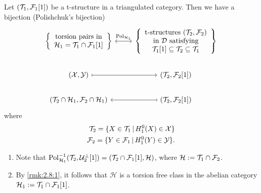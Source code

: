 \begin{prop}[Polishchuk]\label{prop:2.7}
  Let $(\mathcal{T}_1,\mathcal{F}_1[1])$ be a t-structure in a triangulated category.
  Then we have a bijection (Polishchuk's bijection)
  \begin{equation*}
    \begin{tikzcd}
      \left\{
      \begin{array}{c}
        \text{torsion pairs in} \\
        \mathcal{H}_1=\T_1\cap \F_1[1]
      \end{array}
      \right\}
      \arrow[leftrightarrow]{r}{\mathrm{Pol}_{\mathcal{H}_1}}
        &
        \left\{
          \begin{array}{c}
            \text{t-structures }
            (\T_2,\F_2) \\
            \text{ in } \mathcal{D}
            \text{ satisfying } \\ \T_1[1]\subseteq \T_2\subseteq\T_1
          \end{array}
        \right\}\\
      (\mathcal{X},\mathcal{Y})\arrow[mapsto]{r}
        & (\T_2,\F_2[1])\\
      (\T_2\cap\mathcal{H}_1,\F_2\cap\mathcal{H}_1)\arrow[mapsfrom]{r}
        & (\T_2,\F_2[1])
    \end{tikzcd}
  \end{equation*}
  where
  \begin{align*}
    \mathcal{T}_2 = \{X\in\mathcal{T}_1\,|\,H^0_1(X)\in\mathcal{X}\}\\
    \mathcal{F}_2 = \{Y\in\mathcal{F}_1\,|\,H^0_1(Y)\in\mathcal{Y}\}.
  \end{align*}
\end{prop}

\begin{rmk}\label{rmk:2.8}
  \begin{enumerate}[label=(\arabic*)]
    \item\label{rmk:2.8:1} Note that $\mathrm{Pol}^{-1}_{\mathcal{H}_1}(\mathcal{T}_2,\mathcal{U}^\perp_2[1])=
      (\mathcal{T}_2\cap\mathcal{F}_1[1],\mathcal{H})$, where
      $\mathcal{H}:=\mathcal{T}_1\cap\mathcal{F}_2$.

    \item By \ref{rmk:2.8:1}, it follows that $\mathcal{H}$ is a torsion free class in the abelian category
      $\mathcal{H}_1:=\mathcal{T}_1\cap\mathcal{F}_1[1]$.
  \end{enumerate}
\end{rmk}

